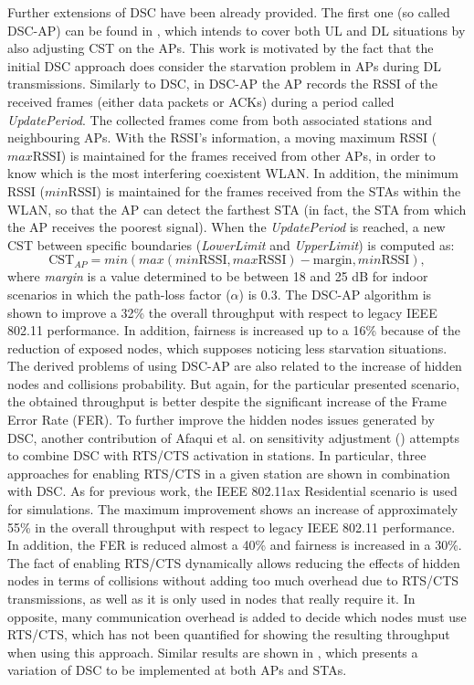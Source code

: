 \documentclass[12pt, a4paper,twoside]{tesi_upf}
\begin{document}
				Further extensions of DSC have been already provided. The first one (so called DSC-AP) can be found in \cite{afaqui2016dynamic}, which intends to cover both UL and DL situations by also adjusting CST on the APs. This work is motivated by the fact that the initial DSC approach does consider the starvation problem in APs during DL transmissions. Similarly to DSC, in DSC-AP the AP records the RSSI of the received frames (either data packets or ACKs) during a period called \textit{UpdatePeriod}. The collected frames come from both associated stations and neighbouring APs. With the RSSI's information, a moving maximum RSSI ($max\mathrm{RSSI}$) is maintained for the frames received from other APs, in order to know which is the most interfering coexistent WLAN. In addition, the minimum RSSI ($min\mathrm{RSSI}$) is maintained for the frames received from the STAs within the WLAN, so that the AP can detect the farthest STA (in fact, the STA from which the AP receives the poorest signal). When the \textit{UpdatePeriod} is reached, a new CST between specific boundaries (\textit{LowerLimit} and \textit{UpperLimit}) is computed as:
				\begin{equation}
					\mathrm{CST}_{AP} = min(max(min\mathrm{RSSI}, max\mathrm{RSSI})- \text{margin}, min\mathrm{RSSI}),
					\nonumber
				\end{equation}
				where \textit{margin} is a value determined to be between 18 and 25 dB for indoor scenarios in which the path-loss factor ($\alpha$) is 0.3. The DSC-AP algorithm is shown to improve a 32\% the overall throughput with respect to legacy IEEE 802.11 performance. In addition, fairness is increased up to a 16\% because of the reduction of exposed nodes, which supposes noticing less starvation situations. The derived problems of using DSC-AP are also related to the increase of hidden nodes and collisions probability. But again, for the particular presented scenario, the obtained throughput is better despite the significant increase of the Frame Error Rate (FER).	To further improve the hidden nodes issues generated by DSC, another contribution of Afaqui et al. on sensitivity adjustment (\cite{afaqui2016rtscts}) attempts to combine DSC with RTS/CTS activation in stations. In particular, three approaches for enabling RTS/CTS in a given station are shown in combination with DSC. As for previous work, the IEEE 802.11ax Residential scenario is used for simulations. The maximum improvement shows an increase of approximately 55\% in the overall throughput with respect to legacy IEEE 802.11 performance. In addition, the FER is reduced almost a 40\% and fairness is increased in a 30\%. The fact of enabling RTS/CTS dynamically allows reducing the effects of hidden nodes in terms of collisions without adding too much overhead due to RTS/CTS transmissions, as well as it is only used in nodes that really require it. In opposite, many communication overhead is added to decide which nodes must use RTS/CTS, which has not been quantified for showing the resulting throughput when using this approach. Similar results are shown in \cite{afaqui2017dynamic}, which presents a variation of DSC to be implemented at both APs and STAs.				
			
\end{document}
